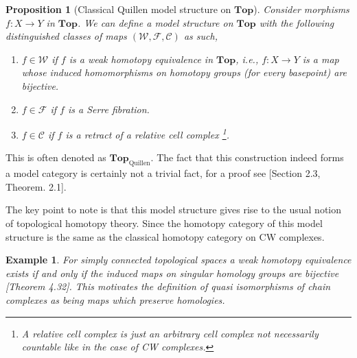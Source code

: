 \documentclass[12pt]{report}
\numberwithin{equation}{section}
\newtheorem{proposition}[dummy]{Proposition}
\newtheorem{example}[dummy]{Example}
\begin{document}
	\begin{proposition}[Classical Quillen model structure on $\mathbf{Top}$]
		Consider morphisms $f:X\to Y $ in $\mathbf{Top}$. We can define a model structure on $\mathbf{Top}$ with the following distinguished classes of maps $(\mathcal{W,F,C})$ as such,
		\begin{enumerate}
			\item $f \in \mathcal{W}$ if $f$ is a weak homotopy equivalence in $\mathbf{Top}$, i.e., $f:X \to Y$ is a map whose induced homomorphisms on homotopy groups (for every basepoint) are bijective.
			\item $f \in \mathcal{F}$ if $f$ is a Serre fibration.
			\item $f \in \mathcal{C}$ if $f$ is a retract of a relative cell complex \footnote{A relative cell complex is just an arbitrary cell complex not necessarily countable like in the case of CW complexes.}.
		\end{enumerate}
	\end{proposition}
	This is often denoted as \( \mathbf{Top}_\mathrm{Quillen} \).
	The fact that this construction indeed forms a model category is certainly not a trivial fact, for a proof see \cite{quillen1967homotopical}[Section 2.3, Theorem. 2.1].
	
	The key point to note is that this model structure gives rise to the usual notion of topological homotopy theory. Since the homotopy category of this model structure is the same as the classical homotopy category on CW complexes.
	
	\begin{example}
		For simply connected topological spaces a weak homotopy equivalence exists if and only if the induced maps on singular homology groups are bijective \cite{hatcher}[Theorem 4.32]. This motivates the definition of quasi isomorphisms of chain complexes as being maps which preserve homologies.
	\end{example}
	
\end{document}
